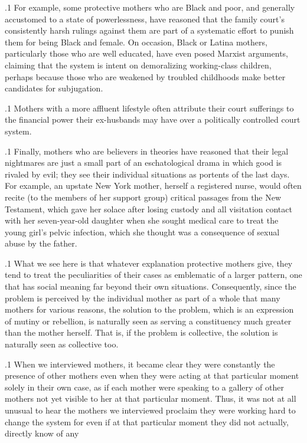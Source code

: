 \documentclass[11pt, twoside]{article}
\begin{document}
{\p.1{%
For example, some protective mothers who are Black and poor, and
generally accustomed to a state of powerlessness, have reasoned that
the family court’s consistently harsh rulings against them are part of a
systematic effort to punish them for being Black and female. On occasion, Black or Latina mothers, particularly those who are well educated,
have even posed Marxist arguments, claiming that the system is intent on demoralizing working-class children, perhaps because those
who are weakened by troubled childhoods make better candidates for
subjugation.
}%

\p.1{%
Mothers with a more affluent lifestyle often attribute their court
sufferings to the financial power their ex-husbands may have over a
politically controlled court system.
}%

\p.1{%
Finally, mothers who are believers in  theories have
reasoned that their legal nightmares are just a small part of an eschatological drama in which good is rivaled by evil; they see their individual
situations as portents of the last days. For example, an upstate New
York mother, herself a registered nurse, would often recite (to the members of her support group) critical passages from the New Testament,
which gave her solace after losing custody and all visitation contact with
her seven-year-old daughter when she sought medical care to treat the
young girl’s pelvic infection, which she thought was a consequence of
sexual abuse by the father.
}%

\p.1{%
What we see here is that whatever explanation protective mothers
give, they tend to treat the peculiarities of their cases as emblematic
of a larger pattern, one that has social meaning far beyond their own
situations. Consequently, since the problem is perceived by the individual mother as part of a whole  that  many mothers
for various reasons, the solution to the problem, which is an expression
of mutiny or rebellion, is naturally seen as serving a constituency much
greater than the mother herself. That is, if the problem is collective, the
solution is naturally seen as collective too.
}%

\p.1{%
When we interviewed mothers, it became clear they were constantly
 the presence of other mothers even when they were acting
at that particular moment solely in their own case, as if each mother
were speaking to a gallery of other mothers not yet visible to her at that
particular moment. Thus, it was not at all unusual to hear the mothers we
interviewed proclaim they were working hard to change the system for
 even if at that particular moment they did not actually, directly
know of any 
}%


}
\end{document}
